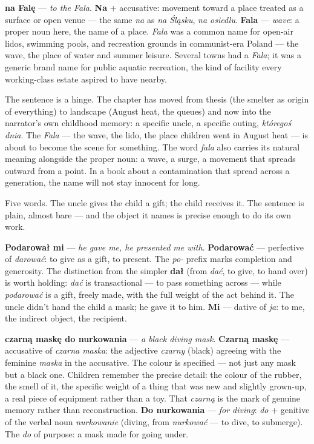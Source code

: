 \textbf{na Falę} --- \textit{to the Fala}.
\textbf{Na} + accusative: movement toward a place
treated as a surface or open venue --- the same
\textit{na} as \textit{na Śląsku}, \textit{na
osiedlu}. \textbf{Fala} --- \textit{wave}: a proper
noun here, the name of a place. \textit{Fala} was
a common name for open-air lidos, swimming pools,
and recreation grounds in communist-era Poland ---
the wave, the place of water and summer leisure.
Several towns had a \textit{Fala}; it was a generic
brand name for public aquatic recreation, the kind
of facility every working-class estate aspired to
have nearby.

\medskip
The sentence is a hinge. The chapter has moved from
thesis (the smelter as origin of everything) to
landscape (August heat, the queues) and now into
the narrator's own childhood memory: a specific
uncle, a specific outing, \textit{któregoś dnia}.
The \textit{Fala} --- the wave, the lido, the place
children went in August heat --- is about to become
the scene for something. The word \textit{fala}
also carries its natural meaning alongside the
proper noun: a wave, a surge, a movement that
spreads outward from a point. In a book about
a contamination that spread across a generation,
the name will not stay innocent for long.



Five words. The uncle gives the child a gift; the
child receives it. The sentence is plain, almost
bare --- and the object it names is precise enough
to do its own work.

\textbf{Podarował mi} --- \textit{he gave me, he
presented me with}. \textbf{Podarować} --- perfective
of \textit{darować}: to give as a gift, to present.
The \textit{po-} prefix marks completion and
generosity. The distinction from the simpler
\textbf{dał} (from \textit{dać}, to give, to hand
over) is worth holding: \textit{dać} is transactional
--- to pass something across --- while
\textit{podarować} is a gift, freely made, with
the full weight of the act behind it. The uncle
didn't hand the child a mask; he gave it to him.
\textbf{Mi} --- dative of \textit{ja}: to me, the
indirect object, the recipient.

\textbf{czarną maskę do nurkowania} --- \textit{a
black diving mask}. \textbf{Czarną maskę} ---
accusative of \textit{czarna maska}: the adjective
\textit{czarny} (black) agreeing with the feminine
\textit{maska} in the accusative. The colour is
specified --- not just any mask but a black one.
Children remember the precise detail: the colour
of the rubber, the smell of it, the specific weight
of a thing that was new and slightly grown-up, a
real piece of equipment rather than a toy. That
\textit{czarną} is the mark of genuine memory
rather than reconstruction. \textbf{Do nurkowania}
--- \textit{for diving}: \textit{do} + genitive of
the verbal noun \textit{nurkowanie} (diving, from
\textit{nurkować} --- to dive, to submerge). The
\textit{do} of purpose: a mask made for going under.

